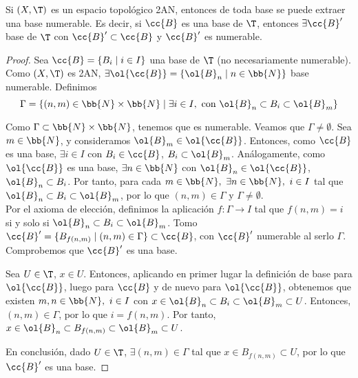 \begin{prop}\label{prop:2AN_ExtraerBaseNumerable}
    Si $(X,\T)$ es un espacio topológico 2AN, entonces de toda base se puede extraer una base numerable. Es decir, si $\cc{B}$ es una base de $\T$, entonces $\exists \cc{B}'$ base de $\T$ con $\cc{B}'\subset \cc{B}$ y $\cc{B}'$ es numerable.
\end{prop}
\begin{proof}
    Sea $\cc{B}=\{B_i\mid i\in I\}$ una base de $\T$ (no necesariamente numerable). Como $(X,\T)$ es 2AN, $\exists \ol{\cc{B}}=\{\ol{B}_n\mid n\in \bb{N}\}$ base numerable. Definimos
    $$\Gamma = \{(n,m)\in \bb{N}\times \bb{N}\mid \exists i\in I,\text{ con } \ol{B}_n \subset B_i\subset \ol{B}_m\}$$

    Como $\Gamma \subset \bb{N}\times \bb{N}$, tenemos que es numerable. Veamos que $\Gamma\neq \emptyset$. Sea $m\in \bb{N}$, y consideramos $\ol{B}_m\in \ol{\cc{B}}$. Entonces, como $\cc{B}$ es una base, $\exists i\in I$ con $B_i\in \cc{B}$, $B_i\subset \ol{B}_m$. Análogamente, como $\ol{\cc{B}}$ es una base, $\exists n\in \bb{N}$ con $\ol{B}_n\in \ol{\cc{B}}$, $\ol{B}_n\subset B_i$. Por tanto, para cada $m\in \bb{N},~\exists n\in \bb{N},~i\in I$ tal que $\ol{B}_n \subset B_i\subset \ol{B}_m$, por lo que $(n,m)\in \Gamma$ y $\Gamma\neq \emptyset$.\\
    
    Por el axioma de elección, definimos la aplicación $f:\Gamma\to I$ tal que $f(n,m)=i$ si y solo si $\ol{B}_n\subset B_{i}\subset \ol{B}_m$. Tomo $\cc{B}'=\{B_{f(n,m)}\mid (n,m)\in \Gamma\}\subset \cc{B}$, con $\cc{B}'$ numerable al serlo $\Gamma$. Comprobemos que $\cc{B}'$ es una base.

    Sea $U\in \T$, $x\in U$. Entonces, aplicando en primer lugar la definición de base para $\ol{\cc{B}}$, luego para $\cc{B}$ y de nuevo para $\ol{\cc{B}}$, obtenemos que existen $m,n\in \bb{N},~i\in I$ con $x\in \ol{B}_n\subset B_i\subset \ol{B}_m\subset U$. Entonces, $(n,m)\in \Gamma$, por lo que $i=f(n,m)$. Por tanto, $x\in \ol{B}_n\subset B_{f(n,m)}\subset \ol{B}_m\subset U$.
    
    En conclusión, dado $U\in \T$, $\exists (n,m)\in \Gamma$ tal que $x\in B_{f(n,m)}\subset U$, por lo que $\cc{B}'$ es una base.
\end{proof}

